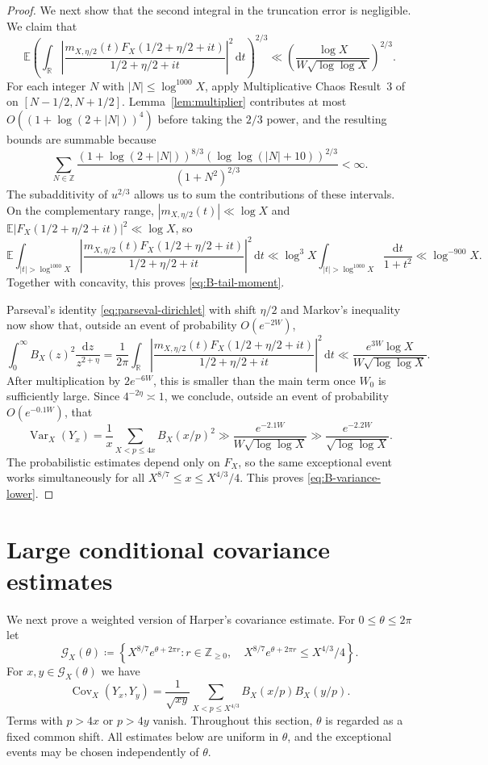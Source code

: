 \documentclass[a4paper,12pt,reqno]{amsart}
\numberwithin{equation}{section}
\theoremstyle{remark}
\newcommand{\R}{\mathbb{R}}
\newcommand{\E}{\mathbb{E}}
\newcommand{\Z}{\mathbb{Z}}
\newcommand{\var}{\operatorname{Var}}
\newcommand{\cov}{\operatorname{Cov}}
\begin{document}
\begin{proof}
We next show that the second integral in the truncation error is
negligible. We claim that
\begin{equation}\label{eq:B-tail-moment}
 \E\left(
 \int_{\R}
 \left|
 \frac{m_{X,\eta/2}(t)F_X(1/2+\eta/2+it)}
 {1/2+\eta/2+it}
 \right|^2\,\mathrm{d}t
 \right)^{2/3}
 \ll
 \left(\frac{\log X}
 {W\sqrt{\log\log X}}\right)^{2/3}.
\end{equation}
For each integer $N$ with $|N|\leq\log^{1000}X$, apply
Multiplicative Chaos Result~3 of
\cite[Section~2.4]{Harper2023Large} on
$[N-1/2,N+1/2]$. Lemma~\ref{lem:multiplier} contributes at most
$O((1+\log(2+|N|))^4)$ before taking the $2/3$ power, and the resulting
bounds are summable because
\[
 \sum_{N\in\Z}
 \frac{(1+\log(2+|N|))^{8/3}
 (\log\log(|N|+10))^{2/3}}
 {(1+N^2)^{2/3}}
 <\infty.
\]
The subadditivity of $u^{2/3}$ allows us to sum the contributions of
these intervals. On the complementary range,
$|m_{X,\eta/2}(t)|\ll\log X$ and
$\E|F_X(1/2+\eta/2+it)|^2\ll\log X$, so
\[
 \E\int_{|t|>\log^{1000}X}
 \left|
 \frac{m_{X,\eta/2}(t)F_X(1/2+\eta/2+it)}
 {1/2+\eta/2+it}
 \right|^2\,\mathrm{d}t
 \ll
 \log^3X\int_{|t|>\log^{1000}X}\frac{\mathrm{d}t}{1+t^2}
 \ll\log^{-900}X.
\]
Together with concavity, this proves \eqref{eq:B-tail-moment}.

Parseval's identity \eqref{eq:parseval-dirichlet} with shift $\eta/2$ and Markov's inequality now show
that, outside an event of probability $O(e^{-2W})$,
\[
 \int_0^\infty B_X(z)^2\frac{\mathrm{d}z}{z^{2+\eta}}
 =
 \frac1{2\pi}\int_{\R}
 \left|
 \frac{m_{X,\eta/2}(t)F_X(1/2+\eta/2+it)}
 {1/2+\eta/2+it}
 \right|^2\,\mathrm{d}t
 \ll
 \frac{e^{3W}\log X}{W\sqrt{\log\log X}}.
\]
After multiplication by $2e^{-6W}$, this is smaller than the main term
once $W_0$ is sufficiently large. Since $4^{-2\eta}\asymp1$, we conclude,
outside an event of probability $O(e^{-0.1W})$, that
\[
 \var_X(Y_x)=\frac1x\sum_{X<p\leq4x}B_X(x/p)^2
 \gg
 \frac{e^{-2.1W}}{W\sqrt{\log\log X}}
 \gg
 \frac{e^{-2.2W}}{\sqrt{\log\log X}}.
\]
The probabilistic estimates depend only on $F_X$, so the same exceptional
event works simultaneously for all
$X^{8/7}\leq x\leq X^{4/3}/4$. This proves
\eqref{eq:B-variance-lower}.
\end{proof}

\section{Large conditional covariance estimates}\label{sec:covariances}

We next prove a weighted version of Harper's covariance estimate. For
$0\leq\theta\leq2\pi$ let
\[
 {\mathcal G}_X(\theta)\coloneqq\left\{
 X^{8/7}e^{\theta+2\pi r}:
 r\in\Z_{\geq0},\quad
 X^{8/7}e^{\theta+2\pi r}\leq X^{4/3}/4
 \right\}.
\]
For $x,y\in{\mathcal G}_X(\theta)$ we have
\[
 \cov_X(Y_x,Y_y)=\frac1{\sqrt{xy}}
 \sum_{X<p\leq X^{4/3}}B_X(x/p)B_X(y/p).
\]
Terms with $p>4x$ or $p>4y$ vanish. Throughout this section, $\theta$
is regarded as a fixed common shift. All estimates below are
uniform in $\theta$, and the exceptional events may be chosen independently
of $\theta$.
\end{document}
